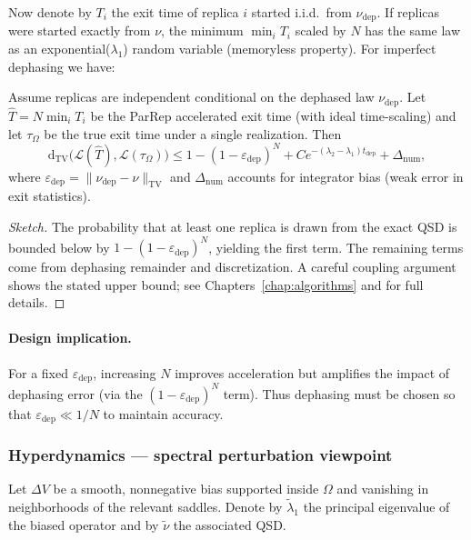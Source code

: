 Now denote by $T_i$ the exit time of replica $i$ started i.i.d.\ from $\nu_{\mathrm{dep}}$. If replicas were started exactly from $\nu$, the minimum $\min_i T_i$ scaled by $N$ has the same law as an exponential($\lambda_1$) random variable (memoryless property). For imperfect dephasing we have:

\begin{theorem}\label{thm:parrep_refined}
Assume replicas are independent conditional on the dephased law $\nu_{\mathrm{dep}}$. Let $\widehat T = N\min_i T_i$ be the ParRep accelerated exit time (with ideal time-scaling) and let $\tau_\Omega$ be the true exit time under a single realization. Then
\[
\mathrm d_{\mathrm{TV}}\big(\mathcal L(\widehat T),\mathcal L(\tau_\Omega)\big)
\le 1 - (1-\varepsilon_{\mathrm{dep}})^N + C e^{-(\lambda_2-\lambda_1) t_{\mathrm{dep}}} + \Delta_{\mathrm{num}},
\]
where $\varepsilon_{\mathrm{dep}}=\|\nu_{\mathrm{dep}}-\nu\|_{\mathrm{TV}}$ and $\Delta_{\mathrm{num}}$ accounts for integrator bias (weak error in exit statistics).
\end{theorem}

\begin{proof}[Sketch]
The probability that at least one replica is drawn from the exact QSD is bounded below by $1-(1-\varepsilon_{\mathrm{dep}})^N$, yielding the first term. The remaining terms come from dephasing remainder and discretization. A careful coupling argument shows the stated upper bound; see Chapters~\ref{chap:algorithms} and \cite{Aristoff2014} for full details.
\end{proof}

\paragraph{Design implication.} For a fixed $\varepsilon_{\mathrm{dep}}$, increasing $N$ improves acceleration but amplifies the impact of dephasing error (via the $(1-\varepsilon_{\mathrm{dep}})^N$ term). Thus dephasing must be chosen so that $\varepsilon_{\mathrm{dep}} \ll 1/N$ to maintain accuracy.

\subsubsection*{Hyperdynamics — spectral perturbation viewpoint}

Let $\Delta V$ be a smooth, nonnegative bias supported inside $\Omega$ and vanishing in neighborhoods of the relevant saddles. Denote by $\widetilde\lambda_1$ the principal eigenvalue of the biased operator and by $\widetilde\nu$ the associated QSD.

